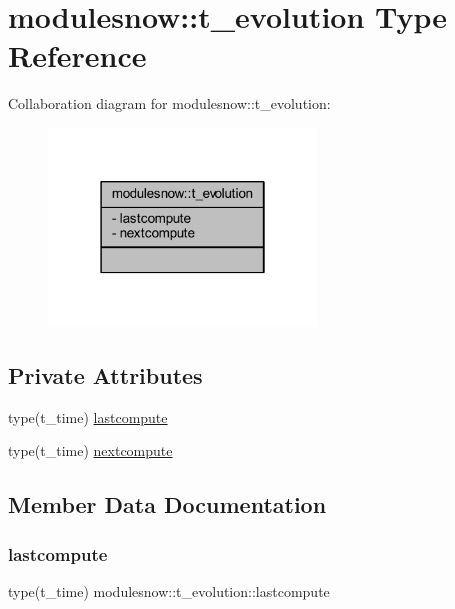 \hypertarget{structmodulesnow_1_1t__evolution}{}\section{modulesnow\+:\+:t\+\_\+evolution Type Reference}
\label{structmodulesnow_1_1t__evolution}


Collaboration diagram for modulesnow\+:\+:t\+\_\+evolution\+:\nopagebreak
\begin{figure}[H]
\begin{center}
\leavevmode
\includegraphics[width=202pt]{structmodulesnow_1_1t__evolution__coll__graph}
\end{center}
\end{figure}
\subsection*{Private Attributes}
\begin{DoxyCompactItemize}
\item 
type(t\+\_\+time) \mbox{\hyperlink{structmodulesnow_1_1t__evolution_aadf99ca673acb032907b794545a77e09}{lastcompute}}
\item 
type(t\+\_\+time) \mbox{\hyperlink{structmodulesnow_1_1t__evolution_a53d990b847600d04bfb0005e4d446549}{nextcompute}}
\end{DoxyCompactItemize}


\subsection{Member Data Documentation}
\mbox{\label{structmodulesnow_1_1t__evolution_aadf99ca673acb032907b794545a77e09}} 
\subsubsection{\texorpdfstring{lastcompute}{lastcompute}}
{\footnotesize\ttfamily type(t\+\_\+time) modulesnow\+::t\+\_\+evolution\+::lastcompute\hspace{0.3cm}{\ttfamily [private]}}

